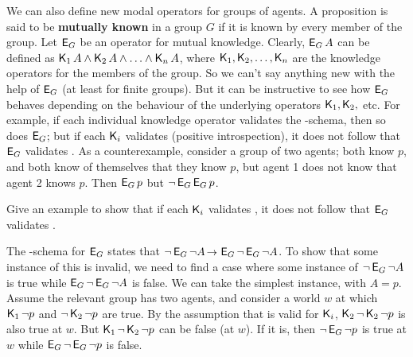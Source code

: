 We can also define new modal operators for groups of agents. A proposition is
said to be \textbf{mutually known} in a group $G$ if it is known by every member
of the group. Let $\operatorname{\mathsf{E}}_G$ be an operator for mutual knowledge. Clearly,
$\operatorname{\mathsf{E}}_G A$ can be defined as $\operatorname{\mathsf{K}{}}_1 A \land \operatorname{\mathsf{K}{}}_2 A \land \ldots \land \operatorname{\mathsf{K}{}}_n A$,
where $\operatorname{\mathsf{K}{}}_1, \operatorname{\mathsf{K}{}}_2, \ldots, \operatorname{\mathsf{K}{}}_n$ are the knowledge operators for the members
of the group. So we can't say anything new with the help of $\operatorname{\mathsf{E}}_G$ (at least
for finite groups). But it can be instructive to see how $\operatorname{\mathsf{E}}_G$ behaves
depending on the behaviour of the underlying operators $\operatorname{\mathsf{K}{}}_1,\operatorname{\mathsf{K}{}}_2,$ etc. For
example, if each individual knowledge operator validates the -schema, then
so does $\operatorname{\mathsf{E}}_G$; but if each $\operatorname{\mathsf{K}{}}_i$ validates  (positive introspection),
it does not follow that $\operatorname{\mathsf{E}}_G$ validates . As a counterexample, consider
a group of two agents; both know $p$, and both know of themselves that they know
$p$, but agent 1 does not know that agent 2 knows $p$. Then $\operatorname{\mathsf{E}}_G p$ but
$\neg \operatorname{\mathsf{E}}_G \operatorname{\mathsf{E}}_G p$.

\begin{exercise}
  Give an example to show that if each $\operatorname{\mathsf{K}{}}_i$ validates ,
  it does not follow that $\operatorname{\mathsf{E}}_G$ validates .
\end{exercise}
\begin{solution}
  The -schema for $\operatorname{\mathsf{E}}_G$ states that
  $\neg \EKn_G \neg A \to \EKn_G \neg \EKn_G \neg A$. To show that some instance
  of this is invalid, we need to find a case where some instance of
  $\neg \operatorname{\mathsf{E}}_G \neg A$ is true while $\operatorname{\mathsf{E}}_G \neg \operatorname{\mathsf{E}}_G \neg A$ is false. We
  can take the simplest instance, with $A=p$. Assume the relevant group has two
  agents, and consider a world $w$ at which $\operatorname{\mathsf{K}{}}_1 \neg p$ and
  $\neg \operatorname{\mathsf{K}{}}_2 \neg p$ are true. By the assumption that  is valid for
  $\operatorname{\mathsf{K}{}}_i$, $\operatorname{\mathsf{K}{}}_2\neg\operatorname{\mathsf{K}{}}_2\neg p$ is also true at $w$. But
  $\operatorname{\mathsf{K}{}}_1\neg \operatorname{\mathsf{K}{}}_2\neg p$ can be false (at $w$). If it is, then
  $\neg \operatorname{\mathsf{E}}_G \neg p$ is true at $w$ while $\operatorname{\mathsf{E}}_G \neg \operatorname{\mathsf{E}}_G \neg p$ is
  false.
\end{solution}


